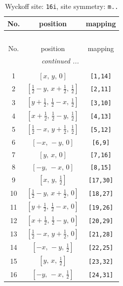 \documentclass[fleqn,8pt]{jsarticle}
\begin{document}
\begin{longtable}{ccc}
\caption{Wyckoff site: {\tt 16i}, site symmetry: {\tt m..}}
 \\
 \hline \hline
No. & position & mapping \\ \hline \endfirsthead

\multicolumn{2}{l}{\tablename\ \thetable{}} \\
 \hline \hline
No. & position & mapping \\ \hline \endhead

 \hline \hline
\multicolumn{2}{r}{\footnotesize\it continued ...} \\ \endfoot

 \hline \hline
\multicolumn{2}{r}{} \\ \endlastfoot

1 & $\left[ x,\, y,\, 0 \right]$ & {\tt [1,14]} \\ \hline
2 & $\left[ \frac{1}{2} - y,\, x + \frac{1}{2},\, \frac{1}{2} \right]$ & {\tt [2,11]} \\ \hline
3 & $\left[ y + \frac{1}{2},\, \frac{1}{2} - x,\, \frac{1}{2} \right]$ & {\tt [3,10]} \\ \hline
4 & $\left[ x + \frac{1}{2},\, \frac{1}{2} - y,\, \frac{1}{2} \right]$ & {\tt [4,13]} \\ \hline
5 & $\left[ \frac{1}{2} - x,\, y + \frac{1}{2},\, \frac{1}{2} \right]$ & {\tt [5,12]} \\ \hline
6 & $\left[ - x,\, - y,\, 0 \right]$ & {\tt [6,9]} \\ \hline
7 & $\left[ y,\, x,\, 0 \right]$ & {\tt [7,16]} \\ \hline
8 & $\left[ - y,\, - x,\, 0 \right]$ & {\tt [8,15]} \\ \hline
9 & $\left[ x,\, y,\, \frac{1}{2} \right]$ & {\tt [17,30]} \\ \hline
10 & $\left[ \frac{1}{2} - y,\, x + \frac{1}{2},\, 0 \right]$ & {\tt [18,27]} \\ \hline
11 & $\left[ y + \frac{1}{2},\, \frac{1}{2} - x,\, 0 \right]$ & {\tt [19,26]} \\ \hline
12 & $\left[ x + \frac{1}{2},\, \frac{1}{2} - y,\, 0 \right]$ & {\tt [20,29]} \\ \hline
13 & $\left[ \frac{1}{2} - x,\, y + \frac{1}{2},\, 0 \right]$ & {\tt [21,28]} \\ \hline
14 & $\left[ - x,\, - y,\, \frac{1}{2} \right]$ & {\tt [22,25]} \\ \hline
15 & $\left[ y,\, x,\, \frac{1}{2} \right]$ & {\tt [23,32]} \\ \hline
16 & $\left[ - y,\, - x,\, \frac{1}{2} \right]$ & {\tt [24,31]} \\
\end{longtable}
\end{document}
